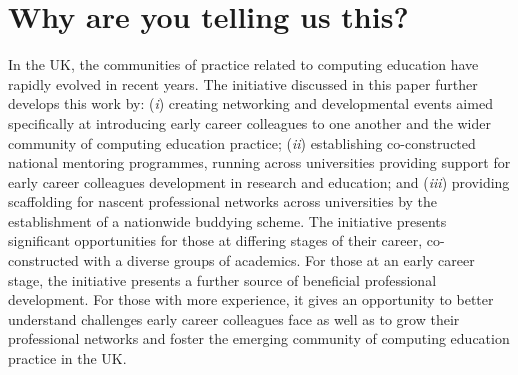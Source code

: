 \documentclass[sigconf]{acmart}
\begin{document}
\section{Why are you telling us this?}
In the UK, the communities of practice related to computing education
have rapidly evolved in recent years. The initiative discussed in this
paper further develops this work by: ({\emph{i}}) creating networking
and developmental events aimed specifically at introducing early
career colleagues to one another and the wider community of computing
education practice; ({\emph{ii}}) establishing co-constructed national
mentoring programmes, running across universities providing support
for early career colleagues development in research and education; and
({\emph{iii}}) providing scaffolding for nascent professional networks
across universities by the establishment of a nationwide buddying
scheme. The initiative presents significant opportunities for those at
differing stages of their career, co-constructed with a diverse groups
of academics.  For those at an early career stage, the initiative
presents a further source of beneficial professional development. For
those with more experience, it gives an opportunity to better
understand challenges early career colleagues face as well as to grow
their professional networks and foster the emerging community of
computing education practice in the UK.


\end{document}
